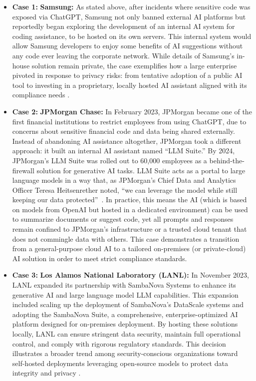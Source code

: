 \begin{itemize}
	\item \textbf{Case 1:} \textbf{Samsung:} As stated above, after incidents where sensitive code was exposed via ChatGPT, Samsung not only banned external \gls{AI} platforms but reportedly began exploring the development of an internal \gls{AI} system for coding assistance, to be hosted on its own servers. This internal system would allow Samsung developers to enjoy some benefits of \gls{AI} suggestions without any code ever leaving the corporate network. While details of Samsung’s in-house solution remain private, the case exemplifies how a large enterprise pivoted in response to privacy risks: from tentative adoption of a public \gls{AI} tool to investing in a proprietary, locally hosted \gls{AI} assistant aligned with its compliance needs \autocite{sharma2023samsung}.
	\item \textbf{Case 2:} \textbf{JPMorgan Chase:} In February 2023, JPMorgan became one of the first financial institutions to restrict employees from using ChatGPT, due to concerns about sensitive financial code and data being shared externally. Instead of abandoning \gls{AI} assistance altogether, JPMorgan took a different approach: it built an internal \gls{AI} assistant named ``LLM Suite.'' By 2024, JPMorgan’s \gls{LLM} Suite was rolled out to 60,000 employees as a behind-the-firewall solution for generative \gls{AI} tasks. \gls{LLM} Suite acts as a portal to large language models in a way that, as JPMorgan’s Chief Data and Analytics Officer Teresa Heitsenrether noted, ``we can leverage the model while still keeping our data protected''~\autocite{Kessel2024}. In practice, this means the \gls{AI} (which is based on models from OpenAI but hosted in a dedicated environment) can be used to summarize documents or suggest code, yet all prompts and responses remain confined to JPMorgan’s infrastructure or a trusted cloud tenant that does not commingle data with others. This case demonstrates a transition from a general-purpose cloud \gls{AI} to a tailored on-premises (or private-cloud) \gls{AI} solution in order to meet strict compliance standards.
	\item \textbf{Case 3:} \textbf{Los Alamos National Laboratory (LANL):} In November 2023, LANL expanded its partnership with SambaNova Systems to enhance its generative \gls{AI} and large language model \gls{LLM} capabilities. This expansion included scaling up the deployment of SambaNova's DataScale systems and adopting the SambaNova Suite, a comprehensive, enterprise-optimized \gls{AI} platform designed for on-premises deployment. By hosting these solutions locally, LANL can ensure stringent data security, maintain full operational control, and comply with rigorous regulatory standards. This decision illustrates a broader trend among security-conscious organizations toward self-hosted deployments leveraging open-source models to protect data integrity and privacy \autocite{SambaNova2023LANL}.
\end{itemize}

